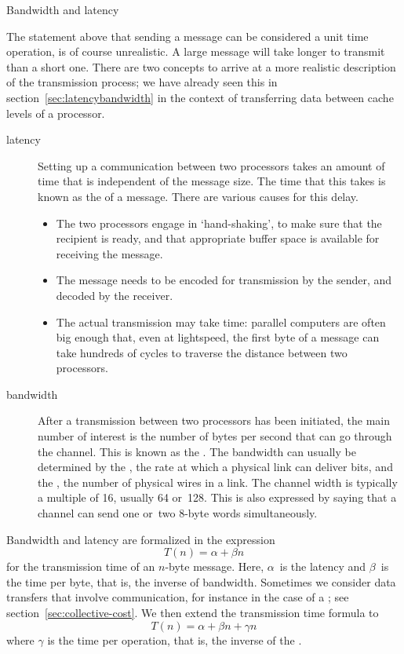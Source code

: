 {Bandwidth and latency}
\label{sec:bwlatency}

The statement above that sending a message can be considered a unit
time operation, is of course unrealistic. A large message will take
longer to transmit than a short one. There are two concepts to arrive
at a more realistic description of the transmission process; we have
already seen this in section~\ref{sec:latencybandwidth} in the context
of transferring data between cache levels of a processor.
\begin{description}
\item[latency] Setting up a communication between two processors takes
  an amount of time that is independent of the message size. The time
  that this takes is known as the  of a message.
  There are various causes for this delay.
  \begin{itemize}
  \item The two processors engage in `hand-shaking', to make sure that
    the recipient is ready, and that appropriate buffer space is
    available for receiving the message.
  \item The message needs to be encoded for transmission by the sender,
    and decoded by the receiver.
  \item The actual transmission may take time: parallel computers are
    often big enough that, even at lightspeed, the first byte of a
    message can take hundreds of cycles to traverse the distance
    between two processors.
  \end{itemize}
\item[bandwidth] After a transmission between two processors has been
  initiated, the main number of interest is the number of bytes per
  second that can go through the channel. This is known as the
  . The bandwidth can usually be determined by
  the , the rate at which a physical link can
  deliver bits, and the , the number of
  physical wires in a link. The channel width is typically a multiple
  of 16, usually 64 or~128. This is also expressed by saying that a
  channel can send one or~two 8-byte words simultaneously.
\end{description}

Bandwidth and latency are formalized in the expression
\[ T(n)=\alpha+\beta n \]
for the transmission time of an $n$-byte message. Here, $\alpha$~is
the latency and $\beta$~is the time per byte, that is, the inverse of
bandwidth. Sometimes we consider data transfers that involve
communication, for instance in the case of a ; see section~\ref{sec:collective-cost}. We then extend
the transmission time formula to
\[ T(n)=\alpha+\beta n+\gamma n \]
where $\gamma$ is the time per operation, that is, the inverse of the
.

